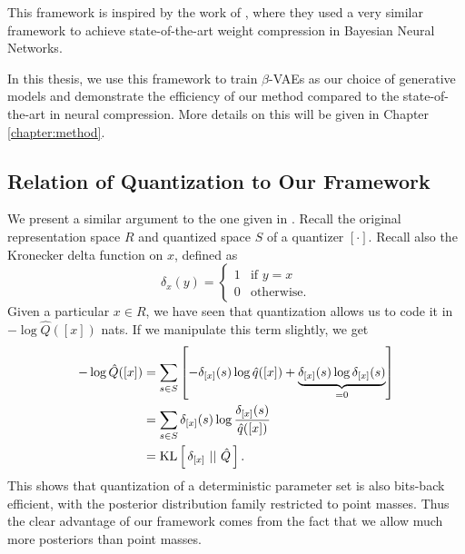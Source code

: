\par 
This framework is inspired by the work of \cite{havasi2018minimal}, where they
used a very similar framework to achieve state-of-the-art weight compression in
Bayesian Neural Networks.
\par
In this thesis, we use this framework to train $\beta$-VAEs as our choice of
generative models and demonstrate the efficiency of our method compared to the
state-of-the-art in neural compression. More details on this will be given in
Chapter \ref{chapter:method}. 

\subsection{Relation of Quantization to Our Framework}
\par
We present a similar argument to the one given in \cite{havasi2018minimal}.
Recall the original representation space $R$ and quantized space $S$ of a
quantizer $[\cdot]$. Recall also the Kronecker delta function on $x$, defined as 
\[
  \delta_{x}(y) = 
  \begin{cases}
    1 & \text{if } y = x \\
    0 & \text{otherwise}.
  \end{cases}
\]
Given a particular $x \in R$, we have seen that
quantization allows us to code it in $-\log \hat{Q}([x])$ nats. If we manipulate
this term slightly, we get
\begin{align*}
  -\log \hat{Q}([x]) &= \sum_{s \in S} \left[ -\delta_{[x]}(s)\log \hat{q}([x]) + \underbrace{\delta_{[x]}(s) \log \delta_{[x]}(s)}_{= 0} \right] \\
                     &= \sum_{s \in S} \delta_{[x]}(s)\log\frac{\delta_{[x]}(s)}{\hat{q}([x])} \\
                     &= \mathrm{KL}\left[\,\delta_{[x]}\,\,||\,\,\hat{Q}\,\right].
\end{align*}
This shows that quantization of a deterministic parameter set is also
bits-back efficient, with the posterior distribution family restricted to point masses. Thus
the clear advantage of our framework comes from the fact that we allow much more
posteriors than point masses. 

